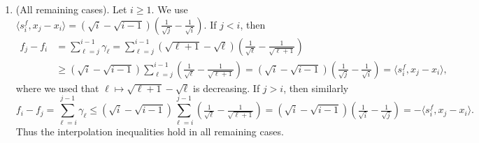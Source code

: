 \documentclass[a4paper]{article}
\renewcommand{\leq}{\leqslant}
\renewcommand{\geq}{\geqslant}
\newcommand{\ip}[2]{\langle #1, #2\rangle}
\begin{document}
\begin{enumerate}[label=($f$.\roman{*})]
        \item (All remaining cases).
        Let \(i\geq 1\).
        We use
        $\ip{s_i^f}{x_j-x_i}
                =
                (\sqrt i-\sqrt{i-1})
                \left(
                \tfrac1{\sqrt j}-\tfrac1{\sqrt i}
                \right)$.
        If \(j<i\), then
        \[
        \begin{aligned}
                f_j-f_i
                &=
                \sum_{\ell=j}^{i-1}\gamma_\ell                                     =
                \sum_{\ell=j}^{i-1}
                (\sqrt{\ell+1}-\sqrt \ell)
                \left(
                \tfrac1{\sqrt \ell}
                -
                \tfrac1{\sqrt{\ell+1}}
                \right)                                                            \\
                &\geq
                (\sqrt i-\sqrt{i-1})
                \sum_{\ell=j}^{i-1}
                \left(
                \tfrac1{\sqrt \ell}
                -
                \tfrac1{\sqrt{\ell+1}}
                \right)                                                           =
                (\sqrt i-\sqrt{i-1})
                \left(
                \tfrac1{\sqrt j}-\tfrac1{\sqrt i}
                \right)                                                           =
                \ip{s_i^f}{x_j-x_i},
        \end{aligned}
        \]
        where we used that \(\ell\mapsto \sqrt{\ell+1}-\sqrt \ell\) is
        decreasing.
        If \(j>i\), then similarly
        \[
                f_i-f_j
                =
                \sum_{\ell=i}^{j-1}\gamma_\ell                                      \leq
                (\sqrt i-\sqrt{i-1})
                \sum_{\ell=i}^{j-1}
                \left(
                \tfrac1{\sqrt \ell}
                -
                \tfrac1{\sqrt{\ell+1}}
                \right)                                                           =
                (\sqrt i-\sqrt{i-1})
                \left(
                \tfrac1{\sqrt i}-\tfrac1{\sqrt j}
                \right)                                                           =
                -\ip{s_i^f}{x_j-x_i}.
        \]
        Thus the interpolation inequalities hold in all remaining cases.
\end{enumerate}
\end{document}
